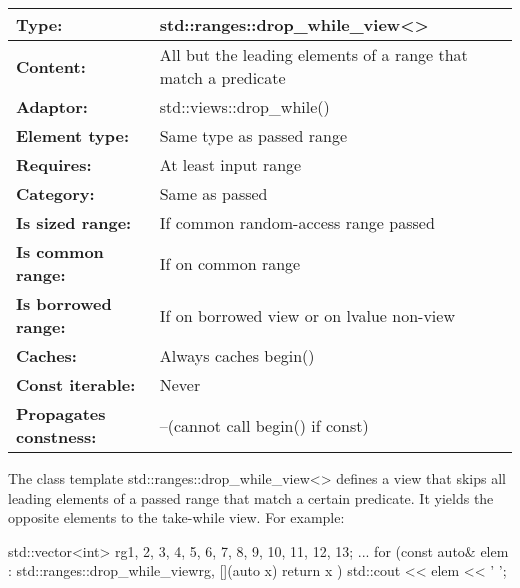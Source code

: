 \begin{longtable}[c]{|l|l|}
\hline
\textbf{Type:}                 & std::ranges::drop\_while\_view\textless{}\textgreater{}        \\ \hline
\endfirsthead
%
\endhead
%
\textbf{Content:}              & All but the leading elements of a range that match a predicate \\ \hline
\textbf{Adaptor:}              & std::views::drop\_while()                                      \\ \hline
\textbf{Element type:}         & Same type as passed range                                      \\ \hline
\textbf{Requires:}             & At least input range                                           \\ \hline
\textbf{Category:}             & Same as passed                                                 \\ \hline
\textbf{Is sized range:}       & If common random-access range passed                           \\ \hline
\textbf{Is common range:}      & If on common range                                             \\ \hline
\textbf{Is borrowed range:}    & If on borrowed view or on lvalue non-view                      \\ \hline
\textbf{Caches:}               & Always caches begin()                                          \\ \hline
\textbf{Const iterable:}       & Never                                                          \\ \hline
\textbf{Propagates constness:} & --(cannot call begin() if const)                               \\ \hline
\end{longtable}

The class template std::ranges::drop\_while\_view<> defines a view that skips all leading elements of a passed range that match a certain predicate. It yields the opposite elements to the take-while view. For example:

\begin{cpp}
std::vector<int> rg{1, 2, 3, 4, 5, 6, 7, 8, 9, 10, 11, 12, 13};
...
for (const auto& elem : std::ranges::drop_while_view{rg, [](auto x) {
						return x %
				}}) {
	std::cout << elem << ' ';
}
\end{cpp}

